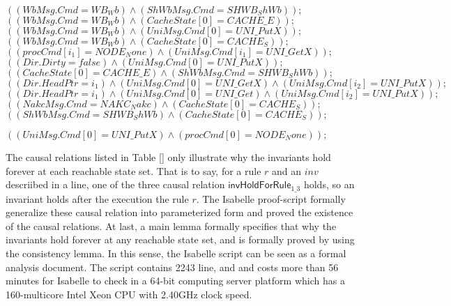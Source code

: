\documentclass{llncs}
\begin{document}
\begin{itemize}
$( ( WbMsg.Cmd=WB_Wb)  \wedge ( ShWbMsg.Cmd=SHWB_ShWb)  ) ;$
$( ( WbMsg.Cmd=WB_Wb)  \wedge ( CacheState[0]=CACHE\_E)  ) ;$
$( ( WbMsg.Cmd=WB_Wb)  \wedge ( UniMsg.Cmd[0]=UNI\_PutX)  ) ;$
$( ( WbMsg.Cmd=WB_Wb)  \wedge ( CacheState[0]=CACHE_S)  ) ;$
$( ( procCmd[i_1]=NODE_None)  \wedge ( UniMsg.Cmd[i_1]=UNI\_GetX)  ) ;$
$( ( Dir.Dirty=false)  \wedge ( UniMsg.Cmd[0]=UNI\_PutX)  ) ;$
$( ( CacheState[0]=CACHE\_E)  \wedge ( ShWbMsg.Cmd=SHWB_ShWb)  ) ;$
$( ( Dir.HeadPtr=i_1)  \wedge ( UniMsg.Cmd[0]=UNI\_GetX)  \wedge ( UniMsg.Cmd[i_2]=UNI\_PutX)  ) ;$
$( ( Dir.HeadPtr=i_1)  \wedge ( UniMsg.Cmd[0]=UNI\_Get)  \wedge ( UniMsg.Cmd[i_2]=UNI\_PutX)  ) ;$
$( ( NakcMsg.Cmd=NAKC_Nakc)  \wedge ( CacheState[0]=CACHE_S)  ) ;$
$( ( ShWbMsg.Cmd=SHWB_ShWb)  \wedge ( CacheState[0]=CACHE_S)  ) ;$

$( ( UniMsg.Cmd[0]=UNI\_PutX)  \wedge ( procCmd[0]=NODE_None)  ) ;$

\end{itemize}
The causal relations listed in Table \ref{} only illustrate why the invariants hold forever at each reachable state set.
That is to say, for a rule $r$ and an $inv$ descriibed in a line, one of the three causal relation $\mathsf{invHoldForRule}_{1\_3}$ holds, so an invariant holds after the execution the rule $r$. The Isabelle proof-script formally generalize these causal relation into parameterized form and proved the existence of the  causal relations. At last, a main lemma formally specifies that why the invariants hold forever at any reachable state set, and is formally proved by using the consistency lemma. In this sense, the Isabelle script can be seen as  a formal analysis document. The script contains 2243 line, and and costs more than 56
minutes for Isabelle to check in a 64-bit computing server platform which has a
160-multicore Intel Xeon CPU with 2.40GHz clock speed.


\end{document}
